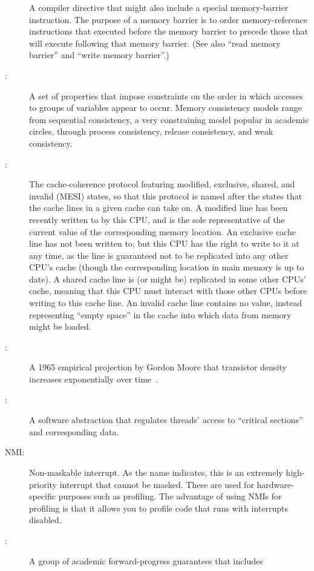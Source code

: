 \begin{description}
	A compiler directive that might also include a special
	memory-barrier instruction.
	The purpose of a memory barrier is to order memory-reference
	instructions that executed before the memory barrier to precede
	those that will execute following that memory barrier.
	(See also ``read memory barrier'' and ``write memory barrier''.)
\item[\IXGh{Memory}{Consistency}:]
	A set of properties that impose constraints on the order in
	which accesses to groups of variables appear to occur.
	Memory consistency models range from sequential consistency,
	a very constraining model popular in academic circles, through
	process consistency, release consistency, and weak consistency.
\item[\IXGaltr{MESI Protocol}{MESI protocol}:]
	The
	cache-coherence protocol featuring
	modified, exclusive, shared, and invalid (MESI) states,
	so that this protocol is named after the states that the
	cache lines in a given cache can take on.
	A modified line has been recently written to by this CPU,
	and is the sole representative of the current value of
	the corresponding memory location.
	An exclusive cache line has not been written to, but this
	CPU has the right to write to it at any time, as the line
	is guaranteed not to be replicated into any other CPU's cache
	(though the corresponding location in main memory is up to date).
	A shared cache line is (or might be) replicated in some other
	CPUs' cache, meaning that this CPU must interact with those other
	CPUs before writing to this cache line.
	An invalid cache line contains no value, instead representing
	``empty space'' in the cache into which data from memory might
	be loaded.
\item[\IXGaltr{Moore's Law}{Moore's Law}:]
	A 1965 empirical projection by Gordon Moore that
	transistor density increases exponentially over
	time~\cite{GordonMoore1965MooresLaw}.
\item[\IXG{Mutual-Exclusion Mechanism}:]
	A software abstraction that regulates threads' access to
	``critical sections'' and corresponding data.
\item[NMI:]
	Non-maskable interrupt.
	As the name indicates, this is an extremely high-priority
	interrupt that cannot be masked.
	These are used for hardware-specific purposes such as profiling.
	The advantage of using NMIs for profiling is that it allows you
	to profile code that runs with interrupts disabled.
\item[\IXG{Non-Blocking}:]
	A group of academic forward-progress guarantees that includes

\end{description}
